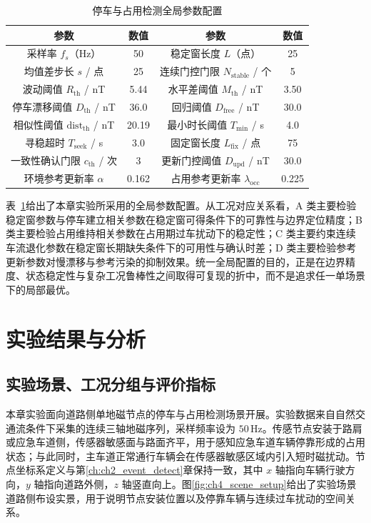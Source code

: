 \documentclass{xdupgthesis}
\begin{document}
\begin{table}[!htbp]
    \centering
    \caption{停车与占用检测全局参数配置}
    \label{tab:ch4_global_params}
    \small
    \setlength{\tabcolsep}{6pt}
    \begin{tabular}{cc|cc}
        \hline
        参数 & 数值 & 参数 & 数值 \\
        \hline
        采样率 $f_s$（Hz） & 50 & 稳定窗长度 $L$（点） & 25 \\
        均值差步长 $s$ / 点 & 25 & 连续门控门限 $N_{\mathrm{stable}}$ / 个 & 5 \\
        波动阈值 $R_{\mathrm{th}}$ / nT & 5.44 & 水平差阈值 $M_{\mathrm{th}}$ / nT & 3.50 \\
        停车漂移阈值 $D_{\mathrm{th}}$ / nT & 36.0 & 回归阈值 $D_{\mathrm{free}}$ / nT & 30.0 \\
        相似性阈值 $\mathrm{dist}_{\mathrm{th}}$ / nT & 20.19 & 最小时长阈值 $T_{\min}$ / s & 4.0 \\
        寻稳超时 $T_{\mathrm{seek}}$ / s & 3.0 & 固定窗长度 $L_{\mathrm{fix}}$ / 点 & 75 \\
        一致性确认门限 $c_{\mathrm{th}}$ / 次 & 3 & 更新门控阈值 $D_{\mathrm{upd}}$ / nT & 30.0 \\
        环境参考更新率 $\alpha$ & 0.162 & 占用参考更新率 $\lambda_{\mathrm{occ}}$ & 0.225 \\
        \hline
    \end{tabular}
\end{table}

表~\ref{tab:ch4_global_params}给出了本章实验所采用的全局参数配置。从工况对应关系看，A 类主要检验稳定窗参数与停车建立相关参数在稳定窗可得条件下的可靠性与边界定位精度；B 类主要检验占用维持相关参数在占用期过车扰动下的稳定性；C 类主要约束连续车流退化参数在稳定窗长期缺失条件下的可用性与确认时差；D 类主要检验参考更新参数对慢漂移与参考污染的抑制效果。统一全局配置的目的，正是在边界精度、状态稳定性与复杂工况鲁棒性之间取得可复现的折中，而不是追求任一单场景下的局部最优。

\section{实验结果与分析}
\label{sec:ch4_exp}

\subsection{实验场景、工况分组与评价指标}
\label{subsec:ch4_data}

本章实验面向道路侧单地磁节点的停车与占用检测场景开展。实验数据来自自然交通流条件下采集的连续三轴地磁序列，采样频率设为 $50\,\mathrm{Hz}$。传感节点安装于路肩或应急车道侧，传感器敏感面与路面齐平，用于感知应急车道车辆停靠形成的占用状态；与此同时，主车道正常通行车辆会在传感器敏感区域内引入短时磁扰动。节点坐标系定义与第\ref{ch:ch2_event_detect}章保持一致，其中 $x$ 轴指向车辆行驶方向，$y$ 轴指向道路外侧，$z$ 轴竖直向上。图\ref{fig:ch4_scene_setup}给出了实验场景道路侧布设实景，用于说明节点安装位置以及停靠车辆与连续过车扰动的空间关系。
\end{document}
